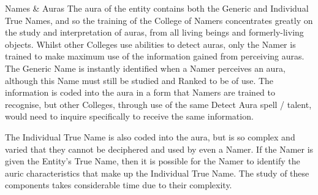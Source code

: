 \begin{Chapter}{Names \& Auras}
The aura of the entity contains both the Generic and Individual True
Names, and so the training of the College of Namers concentrates
greatly on the study and interpretation of auras, from all living
beings and formerly-living objects.  Whilst other Colleges use
abilities to detect auras, only the Namer is trained to make maximum
use of the information gained from perceiving auras.  The Generic Name
is instantly identified when a Namer perceives an aura, although this
Name must still be studied and Ranked to be of use.  The information
is coded into the aura in a form that Namers are trained to recognise,
but other Colleges, through use of the same Detect Aura spell /
talent, would need to inquire specifically to receive the same
information.

The Individual True Name is also coded into the aura, but is so
complex and varied that they cannot be deciphered and used by even a
Namer.  If the Namer is given the Entity’s True Name, then it is
possible for the Namer to identify the auric characteristics that make
up the Individual True Name.  The study of these components takes
considerable time due to their complexity.

\end{Chapter}
